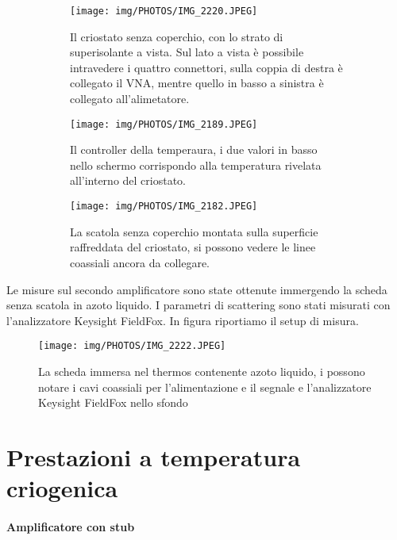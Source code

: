 \documentclass[12pt,oneside]{book}
\begin{document}
\begin{figure}[!htbp]
    \centering
    \begin{subfigure}[t]{0.48\textwidth}
        \centering
        \texttt{[image: img/PHOTOS/IMG\_2220.JPEG]}
        \caption{Il criostato senza coperchio, con lo strato di superisolante a vista. Sul lato a vista è possibile intravedere i quattro connettori, sulla coppia di destra è collegato il VNA, mentre quello in basso a sinistra è collegato all'alimetatore.}
    \end{subfigure}
    \hfill
    \begin{subfigure}[t]{0.48\textwidth}
        \centering
        \texttt{[image: img/PHOTOS/IMG\_2189.JPEG]}
        \caption{Il controller della temperaura, i due valori in basso nello schermo corrispondo alla temperatura rivelata all'interno del criostato.}
    \end{subfigure}
    \hfill
    \begin{subfigure}[t]{0.7\textwidth}
        \centering
        \texttt{[image: img/PHOTOS/IMG\_2182.JPEG]}
        \caption{La scatola senza coperchio montata sulla superficie raffreddata del criostato, si possono vedere le linee coassiali ancora da collegare.}
    \end{subfigure}
    \caption{}
    \label{setup_cryo}
\end{figure}


Le misure sul secondo amplificatore sono state ottenute immergendo la scheda senza scatola in azoto liquido. I parametri di scattering sono stati misurati con l'analizzatore Keysight FieldFox. In figura riportiamo il setup di misura.

\begin{figure}[!htbp]
    \centering
        
    \texttt{[image: img/PHOTOS/IMG\_2222.JPEG]}
    \caption{La scheda immersa nel thermos contenente azoto liquido, i possono notare i cavi coassiali per l'alimentazione e il segnale e l'analizzatore Keysight FieldFox nello sfondo}
    \label{ln2_setup}
\end{figure}


\section{Prestazioni a temperatura criogenica}

\paragraph{Amplificatore con stub}
\end{document}
